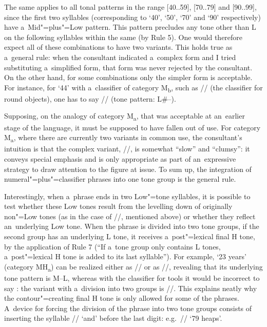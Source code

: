The same applies to all tonal patterns in the range [40..59], [70..79] and [90..99], since the first
two syllables (corresponding to ‘40’, ‘50’, ‘70’ and ‘90’ respectively) have a~Mid"=plus"=Low
pattern. This pattern precludes any tone other than L on the following syllables within the same
 (by Rule 5). One would therefore expect all
of these combinations to have two variants. This holds true as a~general rule: when the consultant
indicated a~complex form and I tried substituting a~simplified form, that form was never rejected by
the consultant. On the other hand, for some combinations only the simpler form is acceptable. For instance, for ‘44’ with a~classifier of category M\textsubscript{b}, such as // (the classifier
for round objects), one has to say // (tone pattern: L\#--).

Supposing, on the {analogy} of category M\textsubscript{a}, that  was acceptable at
an~earlier stage of the language, it must be supposed to have fallen out of use. For category M\textsubscript{a}, where there
are currently two variants in common use, the consultant’s intuition is that the complex variant,
//, is somewhat “slow” and “clumsy”: it conveys special
emphasis and is only appropriate as part of an~expressive strategy to draw attention to the figure
at issue. To sum up, the integration of numeral"=plus"=classifier phrases into one tone group is the general rule.

Interestingly, when a~phrase ends in two Low"=tone syllables, it is possible to test whether these
Low tones result from the levelling down of originally non"=Low tones (as in the case of
//, mentioned above) or whether they reflect an~underlying Low tone. When the phrase is divided into two tone groups, if the second group has an underlying L tone, it receives a~post"=lexical final H tone, by the application of Rule 7 (“If a~tone
group only contains L tones, a~post"=lexical H tone is added to its last syllable”). For example, ‘23
years’ (category MH\textsubscript{a}) can be realized either as // or as //, revealing that its underlying tone pattern is M--L, whereas with the classifier for
tools it would be incorrect to say : the {variant} with a~division into
two groups is //. This explains neatly why the contour"=creating final H tone
is only allowed for some of the phrases. A~device for forcing the division of the phrase into two
tone groups consists of inserting the syllable // ‘and’ before the last digit:
e.g.~// ‘79 heaps’.

